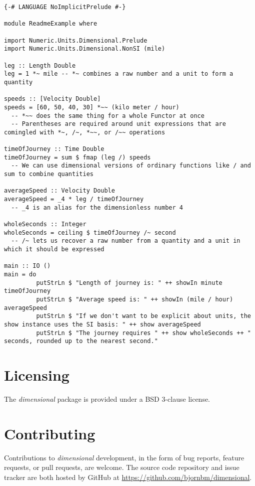\documentclass[11pt]{report}
\newcommand{\packagename}[1]{\textit{#1}}
\newcommand{\thispackage}{\packagename{dimensional}}
\begin{document}
\begin{lstlisting}
{-# LANGUAGE NoImplicitPrelude #-}

module ReadmeExample where

import Numeric.Units.Dimensional.Prelude
import Numeric.Units.Dimensional.NonSI (mile)

leg :: Length Double
leg = 1 *~ mile -- *~ combines a raw number and a unit to form a quantity

speeds :: [Velocity Double]
speeds = [60, 50, 40, 30] *~~ (kilo meter / hour)
  -- *~~ does the same thing for a whole Functor at once
  -- Parentheses are required around unit expressions that are comingled with *~, /~, *~~, or /~~ operations

timeOfJourney :: Time Double
timeOfJourney = sum $ fmap (leg /) speeds
  -- We can use dimensional versions of ordinary functions like / and sum to combine quantities

averageSpeed :: Velocity Double
averageSpeed = _4 * leg / timeOfJourney
  -- _4 is an alias for the dimensionless number 4

wholeSeconds :: Integer
wholeSeconds = ceiling $ timeOfJourney /~ second
  -- /~ lets us recover a raw number from a quantity and a unit in which it should be expressed

main :: IO ()
main = do
         putStrLn $ "Length of journey is: " ++ showIn minute timeOfJourney
         putStrLn $ "Average speed is: " ++ showIn (mile / hour) averageSpeed
         putStrLn $ "If we don't want to be explicit about units, the show instance uses the SI basis: " ++ show averageSpeed
         putStrLn $ "The journey requires " ++ show wholeSeconds ++ " seconds, rounded up to the nearest second."
\end{lstlisting}

\section{Licensing}

The \thispackage{} package is provided under a BSD 3-clause license.

\section{Contributing}

Contributions to \thispackage{} development, in the form of bug reports,
feature requests, or pull requests, are welcome. The source code repository and issue
tracker are both hosted by GitHub at \url{https://github.com/bjornbm/dimensional}.
\end{document}
